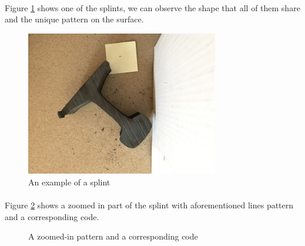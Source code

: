 \paragraph{}
Figure \ref{fig:example_of_a_splint} shows one of the splints, we can observe the shape that all of them share and the unique pattern on the surface. 
\begin{figure}[H]
	\centering
	\includegraphics[width=0.75\textwidth]{images/example_splint}
	\caption{An example of a splint}
	\label{fig:example_of_a_splint}
\end{figure}

\paragraph{}
Figure \ref{fig:pattern_to_code} shows a zoomed in part of the splint with aforementioned lines pattern and a corresponding code.
\begin{figure}[H]
     \centering
     \hfill
     \caption{A zoomed-in pattern and a corresponding code}
     \label{fig:pattern_to_code}
\end{figure}

